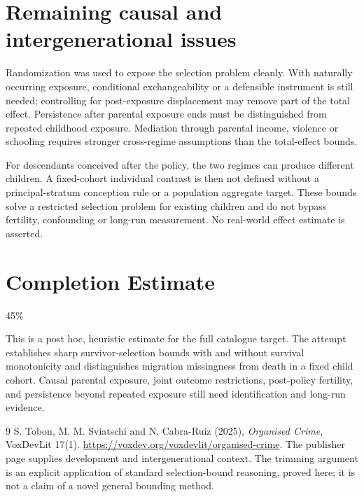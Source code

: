 \documentclass[11pt]{article}
\theoremstyle{definition}
\begin{document}
\section*{Remaining causal and intergenerational issues}
Randomization was used to expose the selection problem cleanly. With naturally
occurring exposure, conditional exchangeability or a defensible instrument is
still needed; controlling for post-exposure displacement may remove part of
the total effect. Persistence after parental exposure ends must be distinguished
from repeated childhood exposure. Mediation through parental income, violence
or schooling requires stronger cross-regime assumptions than the total-effect
bounds.

For descendants conceived after the policy, the two regimes can produce different
children. A fixed-cohort individual contrast is then not defined without a
principal-stratum conception rule or a population aggregate target. These bounds
solve a restricted selection problem for existing children and do not bypass
fertility, confounding or long-run measurement. No real-world effect estimate
is asserted.

\section{Completion Estimate}
45\%

This is a post hoc, heuristic estimate for the full catalogue target.
The attempt establishes sharp survivor-selection bounds with and without survival monotonicity and distinguishes migration missingness from death in a fixed child cohort. Causal parental exposure, joint outcome restrictions, post-policy fertility, and persistence beyond repeated exposure still need identification and long-run evidence.

\begin{thebibliography}{9}
 S. Tobon, M. M. Sviatschi and N. Cabra-Ruiz (2025),
\emph{Organised Crime}, VoxDevLit 17(1).
\url{https://voxdev.org/voxdevlit/organised-crime}.
The publisher page supplies development and intergenerational context.
The trimming argument is an explicit application of standard selection-bound
reasoning, proved here; it is not a claim of a novel general bounding method.
\end{thebibliography}
\end{document}
